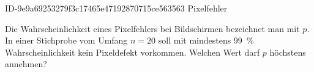 \begin{exercise}
      {ID-9e9a69253279f3c17465e47192870715ce563563}
      {Pixelfehler}
  \ifproblem\problem\par
    Die Wahrscheinlichkeit eines Pixelfehlers bei
    Bildschirmen bezeichnet man mit $p$.
    In einer Stichprobe vom Umfang $n=\num{20}$
    soll mit mindestens \SI{99}{\percent}
    Wahrscheinlichkeit kein Pixeldefekt vorkommen.
    Welchen Wert darf $p$ höchstens annehmen?
  \fi
\end{exercise}
